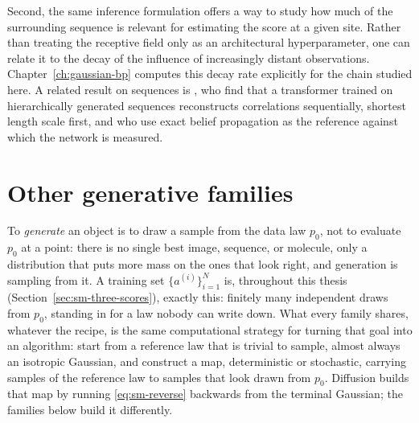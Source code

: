 Second, the same inference formulation offers a way to study how much of the
surrounding sequence is relevant for estimating the score at a given site.
Rather than treating the receptive field only as an architectural hyperparameter,
one can relate it to the decay of the influence of increasingly distant
observations. Chapter~\ref{ch:gaussian-bp} computes this decay rate explicitly
for the chain studied here. A related result on sequences is
\citet{garnierbrun2024transformers}, who find that a transformer trained on
hierarchically generated sequences reconstructs correlations sequentially,
shortest length scale first, and who use exact belief propagation as the
reference against which the network is measured.

\section{Other generative families}
\label{sec:sm-taxonomy}

To \emph{generate} an
object is to draw a sample from the data law $p_0$, not to evaluate $p_0$ at a
point: there is no single best image, sequence, or molecule, only a
distribution that puts more mass on the ones that look right, and generation
is sampling from it. A training set $\{a^{(i)}\}_{i=1}^N$ is, throughout this
thesis (Section~\ref{sec:sm-three-scores}), exactly this: finitely many
independent draws from $p_0$, standing in for a law nobody can write down.
What every family shares, whatever the recipe, is the same computational
strategy for turning that goal into an algorithm: start from a reference law
that is trivial to sample, almost always an isotropic Gaussian, and construct
a map, deterministic or stochastic, carrying samples of the reference law to
samples that look drawn from $p_0$. Diffusion builds that map by running
\eqref{eq:sm-reverse} backwards from the terminal Gaussian; the families below
build it differently.

